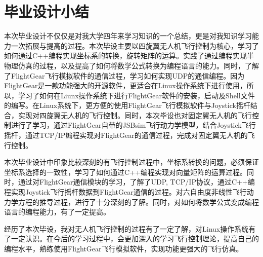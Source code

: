 
\chapter*{毕业设计小结}

本次毕业设计不仅仅是对我大学四年来学习知识的一个总结，更是对我知识学习能力一次拓展与提高的过程。本次毕设主要以四旋翼无人机飞行控制为核心，学习了如何通过C++编程实现坐标系的转换，旋转矩阵的运算。实践了通过编程实现半物理仿真的过程，以及提高了如何将数学公式转换为编程语言的能力。同时，了解了FlightGear飞行模拟软件的通信过程，学习如何实现UDP的通信编程。因为FlightGear是一款功能强大的开源软件，更适合在Linux操作系统下进行使用，所以，学习了如何在Liunx操作系统下进行FlightGear软件的安装，启动及Shell文件的编写。在Linux系统下，更方便的使用FlightGear飞行模拟软件与Joystick摇杆结合，实现对四旋翼无人机的飞行控制。同时，本次毕设也对固定翼无人机的飞行控制进行了学习，通过FlightGear自带的JSBsim飞行动力学模型，结合Joystick飞行摇杆，通过TCP/IP编程实现对FlightGear的通信过程，完成对固定翼无人机的飞行控制。

本次毕业设计中印象比较深刻的有飞行控制过程中，坐标系转换的问题，必须保证坐标系选择的一致性，学习了如何通过C++编程实现对向量矩阵的运算过程。同时，通过对FlightGear通信模块的学习，了解了UDP, TCP/IP协议，通过C++编程实现Joystick飞行摇杆数据到FlightGear通信的过程。对六自由度非线性飞行动力学方程的推导过程，进行了十分深刻的了解。同时，对如何将数学公式变成编程语言的编程能力，有了一定提高。

经历了本次毕设，我对无人机飞行控制的过程有了一定了解，对Linux操作系统有了一定认识。在今后的学习过程中，会更加深入的学习飞行控制理论，提高自己的编程水平，熟练使用FlightGear飞行模拟软件，实现功能更强大的飞行仿真。


